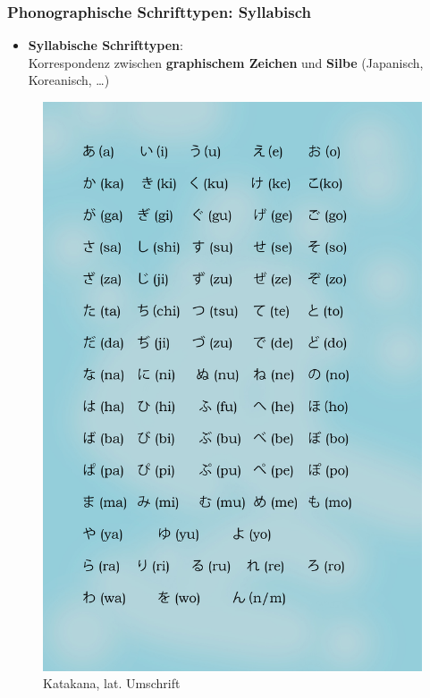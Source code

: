 \begin{frame}
\frametitle{Phonographische Schrifttypen: Syllabisch}

\begin{minipage}{.59\textwidth}
\begin{itemize}
	\item \textbf{Syllabische Schrifttypen}: \\
	Korrespondenz zwischen \textbf{graphischem Zeichen} und \textbf{Silbe} (Japanisch, Koreanisch, \dots)
	

\end{itemize}
\end{minipage}\hfill%
\begin{minipage}{.4\textwidth}
	\begin{figure}
		\centering
		
		\includegraphics[scale=.057]{material/05Katakana}
		\caption{Katakana, lat. Umschrift}
	\end{figure}
\end{minipage}

\end{frame}


